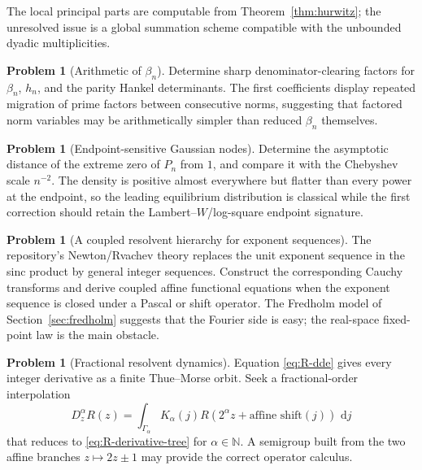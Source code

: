 \documentclass[11pt]{article}
\theoremstyle{definition}
\newtheorem{problem}[theorem]{Problem}
\theoremstyle{remark}
\newcommand{\N}{\mathbb N}
\newcommand{\dd}{\,\mathrm d}
\begin{document}
The local principal parts are computable from Theorem~\ref{thm:hurwitz}; the unresolved
issue is a global summation scheme compatible with the unbounded dyadic multiplicities.

\begin{problem}[Arithmetic of \(\beta_n\)]
Determine sharp denominator-clearing factors for \(\beta_n\), \(h_n\), and the parity
Hankel determinants.  The first coefficients display repeated migration of prime factors
between consecutive norms, suggesting that factored norm variables may be arithmetically
simpler than reduced \(\beta_n\) themselves.
\end{problem}

\begin{problem}[Endpoint-sensitive Gaussian nodes]
Determine the asymptotic distance of the extreme zero of \(P_n\) from \(1\), and compare it
with the Chebyshev scale \(n^{-2}\).  The density is positive almost everywhere but flatter
than every power at the endpoint, so the leading equilibrium distribution is classical
while the first correction should retain the Lambert--\(W\)/log-square endpoint signature.
\end{problem}

\begin{problem}[A coupled resolvent hierarchy for exponent sequences]
The repository's Newton/Rvachev theory replaces the unit exponent sequence in the sinc
product by general integer sequences.  Construct the corresponding Cauchy transforms and
derive coupled affine functional equations when the exponent sequence is closed under a
Pascal or shift operator.  The Fredholm model of Section~\ref{sec:fredholm} suggests that
the Fourier side is easy; the real-space fixed-point law is the main obstacle.
\end{problem}

\begin{problem}[Fractional resolvent dynamics]
Equation \eqref{eq:R-dde} gives every integer derivative as a finite Thue--Morse orbit.
Seek a fractional-order interpolation
\[
 D_z^{\alpha}R(z)=\int_{\Gamma_\alpha}K_\alpha(j)
 R(2^\alpha z+\text{affine shift}(j))\,\dd j
\]
that reduces to \eqref{eq:R-derivative-tree} for \(\alpha\in\N\).  A semigroup built from
the two affine branches \(z\mapsto2z\pm1\) may provide the correct operator calculus.
\end{problem}
\end{document}
